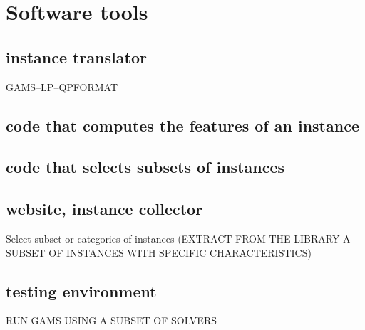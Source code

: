 
\section{Software tools}\label{subsec:tools}

\subsection{instance translator}
GAMS--LP--QPFORMAT


\subsection{code that computes the features of an instance}

\subsection{code that selects subsets of instances}

\subsection{website, instance collector}
Select subset or categories of instances (EXTRACT FROM THE LIBRARY A SUBSET OF INSTANCES WITH SPECIFIC CHARACTERISTICS)

\subsection{testing environment}
RUN GAMS USING A SUBSET OF SOLVERS


